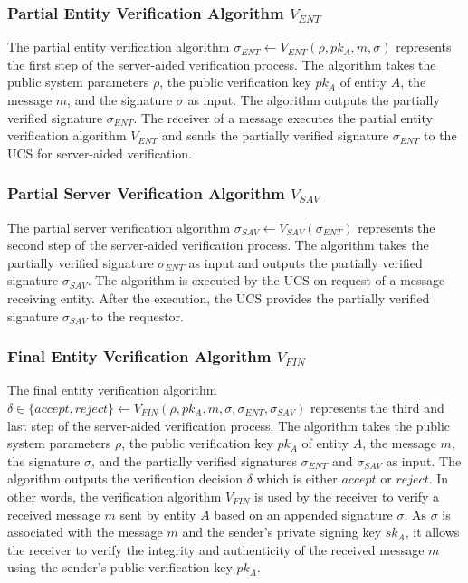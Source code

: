 \subsubsection{Partial Entity Verification Algorithm $V_{ENT}$}
The partial entity verification algorithm $\sigma_{ENT} \leftarrow V_{ENT}(\rho, pk_A, m, \sigma)$ represents the first step of the server-aided verification process.
The algorithm takes the public system parameters $\rho$, the public verification key $pk_A$ of entity $A$, the message $m$, and the signature $\sigma$ as input.
The algorithm outputs the partially verified signature $\sigma_{ENT}$.
The receiver of a message executes the partial entity verification algorithm $V_{ENT}$ and sends the partially verified signature $\sigma_{ENT}$ to the UCS for server-aided verification.

\subsubsection{Partial Server Verification Algorithm $V_{SAV}$}
The partial server verification algorithm $\sigma_{SAV} \leftarrow V_{SAV}(\sigma_{ENT})$ represents the second step of the server-aided verification process.
The algorithm takes the partially verified signature $\sigma_{ENT}$ as input and outputs the partially verified signature $\sigma_{SAV}$.
The algorithm is executed by the UCS on request of a message receiving entity.
After the execution, the UCS provides the partially verified signature $\sigma_{SAV}$ to the requestor.

\subsubsection{Final Entity Verification Algorithm $V_{FIN}$}
The final entity verification algorithm $\delta \in \{accept, reject\} \leftarrow V_{FIN}(\rho, pk_A, m, \sigma, \sigma_{ENT}, \sigma_{SAV})$ represents the third and last step of the server-aided verification process.
The algorithm takes the public system parameters $\rho$, the public verification key $pk_A$ of entity $A$, the message $m$, the signature $\sigma$, and the partially verified signatures $\sigma_{ENT}$ and $\sigma_{SAV}$ as input.
The algorithm outputs the verification decision $\delta$ which is either $accept$ or $reject$.
In other words, the verification algorithm $V_{FIN}$ is used by the receiver to verify a received message $m$ sent by entity $A$ based on an appended signature $\sigma$.
As $\sigma$ is associated with the message $m$ and the sender's private signing key $sk_A$, it allows the receiver to verify the integrity and authenticity of the received message $m$ using the sender's public verification key $pk_A$.

